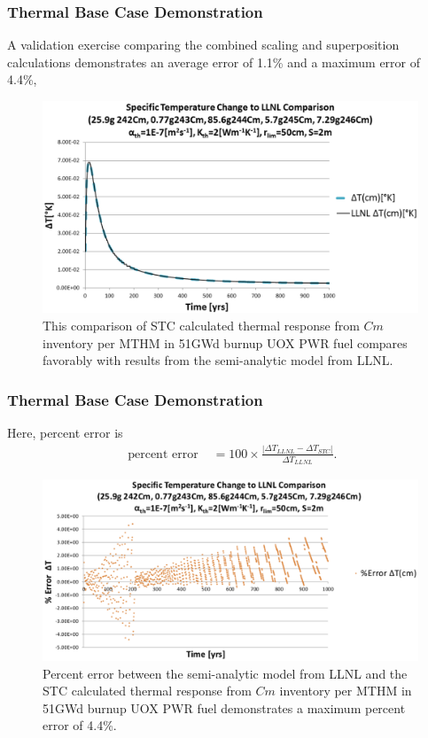 
\begin{frame}[ctb!]
  \frametitle{Thermal Base Case Demonstration}
  \footnotesize{
A validation exercise comparing the combined scaling and  
superposition calculations demonstrates an average error of 1.1\% and a 
maximum error of 4.4\%,
\begin{figure}[htp!]
\begin{center}
\includegraphics[width=\columnwidth]{./thermal_demonstration/CmValidation.eps}
\end{center}
\caption{This comparison of STC calculated thermal response from $Cm$ 
inventory per MTHM in 51GWd burnup UOX PWR fuel compares favorably with results 
from the semi-analytic model from LLNL.} 
\label{fig:CmValidation}
\end{figure}
  }
\end{frame}


\begin{frame}[ctb!]
  \frametitle{Thermal Base Case Demonstration}
Here, percent error is 
\begin{align}
\mbox{ percent error } &= 100\times\frac{\left|\Delta T_{LLNL} - \Delta 
T_{STC}\right|}{ \Delta T_{LLNL}}.
\end{align}
\begin{figure}[htp!]
\begin{center}
\includegraphics[width=\columnwidth]{./thermal_demonstration/CmPercentError.eps}
\end{center}
\caption{Percent error between the semi-analytic model from LLNL and the 
STC 
calculated thermal response from $Cm$ inventory per MTHM in 51GWd burnup UOX 
PWR fuel demonstrates a maximum percent error of 4.4\%.}
\label{fig:CmPercentError}
\end{figure}
\end{frame}

